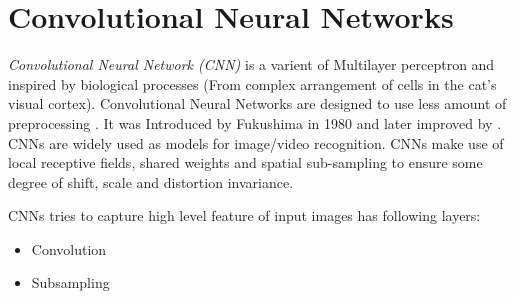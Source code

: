 \section{Convolutional Neural Networks}
\emph{Convolutional Neural Network (CNN)} is a varient of Multilayer perceptron  and inspired by biological processes (From complex arrangement of cells in the cat’s visual cortex). Convolutional Neural Networks are designed to use less amount of preprocessing \cite{lecun1998gradient}. It was Introduced by Fukushima in 1980 and later  improved by \citet{lecun1998gradient}. CNNs are widely used as models for  image/video recognition. CNNs make use of local receptive fields, shared weights and spatial sub-sampling to ensure some degree of shift, scale and distortion invariance.

CNNs tries to capture high level feature of input images  has following layers:
\begin{itemize}
\item Convolution
\item Subsampling
\end{itemize}


